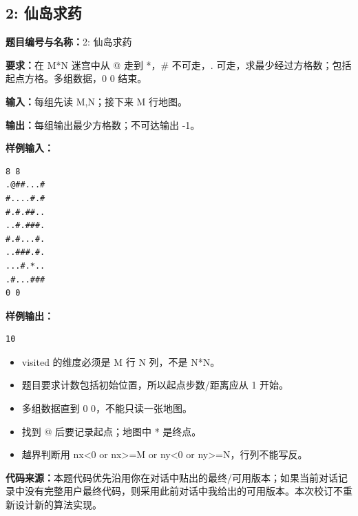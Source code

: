 \documentclass[10pt,a4paper,fontset=none]{ctexart}
\newcommand{\codesource}{\par\noindent\textbf{代码来源：}本题代码优先沿用你在对话中贴出的最终/可用版本；如果当前对话记录中没有完整用户最终代码，则采用此前对话中我给出的可用版本。本次校订不重新设计新的算法实现。\par\vspace{0.2em}}
\begin{document}
\subsection{2: 仙岛求药}
\begin{taskbox}
\textbf{题目编号与名称：}2: 仙岛求药\par
\textbf{要求：}在 M*N 迷宫中从 @ 走到 *，\# 不可走，. 可走，求最少经过方格数；包括起点方格。多组数据，0 0 结束。\par
\textbf{输入：}每组先读 M,N；接下来 M 行地图。\par
\textbf{输出：}每组输出最少方格数；不可达输出 -1。\par
\textbf{样例输入：}
\begin{lstlisting}[style=sample]
8 8
.@##...#
#....#.#
#.#.##..
..#.###.
#.#...#.
..###.#.
...#.*..
.#...###
0 0
\end{lstlisting}
\textbf{样例输出：}
\begin{lstlisting}[style=sample]
10
\end{lstlisting}
\end{taskbox}
\begin{mistakebox}
\begin{itemize}
  \item visited 的维度必须是 M 行 N 列，不是 N*N。
  \item 题目要求计数包括初始位置，所以起点步数/距离应从 1 开始。
  \item 多组数据直到 0 0，不能只读一张地图。
  \item 找到 @ 后要记录起点；地图中 * 是终点。
  \item 越界判断用 nx<0 or nx>=M or ny<0 or ny>=N，行列不能写反。
\end{itemize}
\end{mistakebox}
\codesource
\end{document}
